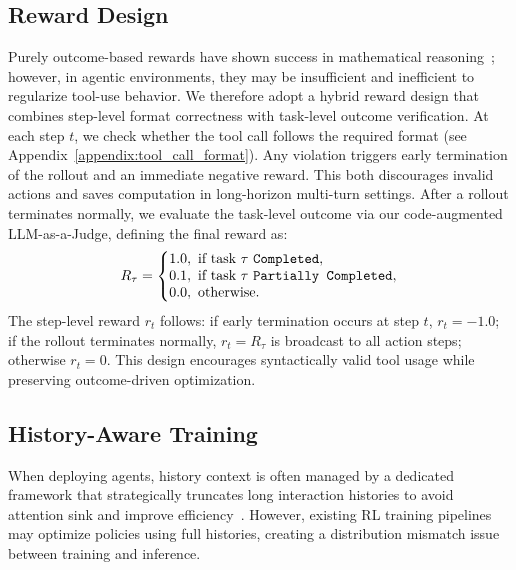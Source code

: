 \documentclass{article}
\theoremstyle{plain}
\theoremstyle{definition}
\theoremstyle{remark}
\begin{document}
\subsection{Reward Design} \label{sec:reward_design}
Purely outcome-based rewards have shown success in mathematical reasoning~\citep{deepseek-r1}; however, in agentic environments, they may be insufficient and inefficient to regularize tool-use behavior.
We therefore adopt a hybrid reward design that combines step-level format correctness with task-level outcome verification.
At each step $t$, we check whether the tool call follows the required format (see Appendix~\ref{appendix:tool_call_format}). Any violation triggers early termination of the rollout and an immediate negative reward. This both discourages invalid actions and saves computation in long-horizon multi-turn settings. After a rollout terminates normally, we evaluate the task-level outcome via our code-augmented LLM-as-a-Judge, defining the final reward as:
\begin{equation}
R_\tau =
\left\{
\begin{array}{@{}l@{\,}l@{}}
1.0, & \text{ if task }\tau\ \texttt{Completed},\\
0.1, & \text{ if task }\tau\ \texttt{Partially Completed},\\
0.0, & \text{ otherwise}.
\end{array}
\right.
\end{equation}
The step-level reward $r_t$ follows: if early termination occurs at step $t$, $r_t=-1.0$; if the rollout terminates normally, $r_t=R_\tau$ is broadcast to all action steps; otherwise $r_t=0$. This design encourages syntactically valid tool usage while preserving outcome-driven optimization.

\subsection{History-Aware Training} \label{sec:history_aware_training}
When deploying agents, history context is often managed by a dedicated framework that strategically truncates long interaction histories to avoid attention sink and improve efficiency~\citep{liu-etal-2024-lost,claude_ce,zhang2025agenticcontextengineeringevolving}. However, existing RL training pipelines may optimize policies using full histories, creating a distribution mismatch issue between training and inference.
\end{document}
